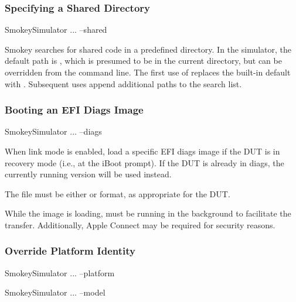 \subsubsection{Specifying a Shared Directory}

\begin{CommandLine}
SmokeySimulator ... --shared ~~
\end{CommandLine}

Smokey searches for shared code in a predefined directory.  In the simulator,
the default path is , which is presumed to be in the current
directory, but can be overridden from the command line.  The first use of
 replaces the built-in default with .
Subsequent uses append additional paths to the search list.

\subsubsection{Booting an EFI Diags Image}

\begin{CommandLine}
SmokeySimulator ... --diags ~~
\end{CommandLine}

When link mode is enabled, load a specific EFI diags image if the DUT is in
recovery mode (i.e., at the iBoot prompt).  If the DUT is already in diags, the
currently running version will be used instead.

The file  must be either  or 
format, as appropriate for the DUT.

While the image is loading,  must be running in the background
to facilitate the transfer.  Additionally, Apple Connect may be required for
security reasons.

\subsubsection{Override Platform Identity}

\begin{CommandLine}
SmokeySimulator ... --platform ~~
\end{CommandLine}

\begin{CommandLine}
SmokeySimulator ... --model ~~
\end{CommandLine}

